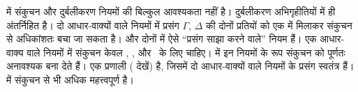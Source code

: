 \documentclass[../../../include/open-logic-section]{subfiles}
\begin{document}
 में संकुचन और दुर्बलीकरण नियमों की बिल्कुल आवश्यकता नहीं है।
दुर्बलीकरण अभिगृहीतियों में ही अंतर्निहित है। दो आधार-वाक्यों वाले नियमों में
प्रसंग $\Gamma$, $\Delta$ की दोनों प्रतियों को एक में मिलाकर संकुचन से
अधिकांशतः बचा जा सकता है।  और  दोनों में ऐसे ``प्रसंग
साझा करने वाले'' नियम हैं। एक आधार-वाक्य वाले नियमों में संकुचन केवल
\RightR{\lor}, \LeftR{\land}, \RightR{\lexists} और~\LeftR{\lforall} के लिए
चाहिए।  में इन नियमों के रूप संकुचन को पूर्णतः अनावश्यक बना देते
हैं। एक प्रणाली  ( देखें) है, जिसमें दो आधार-वाक्यों
वाले नियमों के प्रसंग स्वतंत्र हैं।  में संकुचन  से भी
अधिक महत्त्वपूर्ण है।


\end{document}
